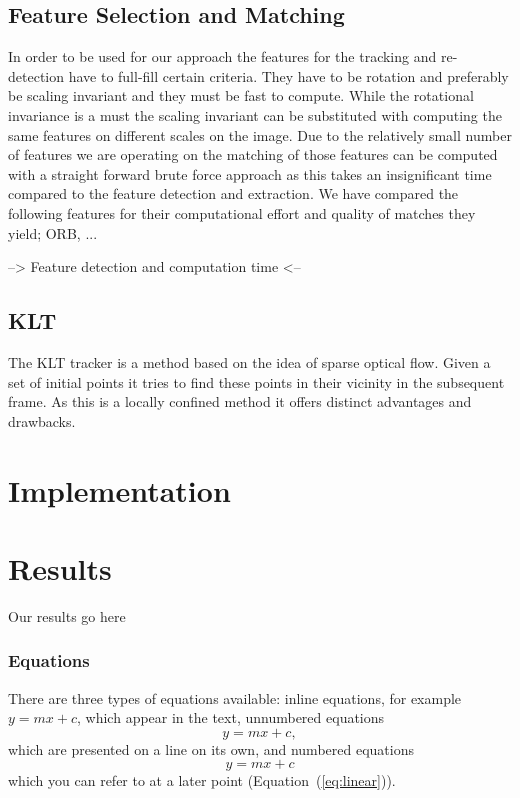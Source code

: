 \documentclass[10pt,conference,compsocconf]{IEEEtran}
\begin{document}
\subsection{Feature Selection and Matching}
In order to be used for our approach the features for the tracking and re-detection have to full-fill certain criteria. They have to be rotation and preferably be scaling invariant and they must be fast to compute. While the rotational invariance is a must the scaling invariant can be substituted with computing the same features on different scales on the image. Due to the relatively small number of features we are operating on the matching of those features can be computed with a straight forward brute force approach as this takes an insignificant time compared to the feature detection and extraction. We have compared the following features for their computational effort and quality of matches they yield; ORB, ...

--> Feature detection and computation time <--

\subsection{KLT}

The KLT tracker is a method based on the idea of sparse optical flow. Given a set of initial points it tries to find these points in their vicinity in the subsequent frame. As this is a locally confined method it offers distinct advantages and drawbacks.

\section{Implementation}

\section{Results}

Our results go here


\subsubsection{Equations}

There are three types of equations available: inline equations, for
example $y=mx + c$, which appear in the text, unnumbered equations
$$y=mx + c,$$
which are presented on a line on its own, and numbered equations
\begin{equation}
  \label{eq:linear}
  y = mx + c
\end{equation}
which you can refer to at a later point (Equation~(\ref{eq:linear})).
\end{document}
